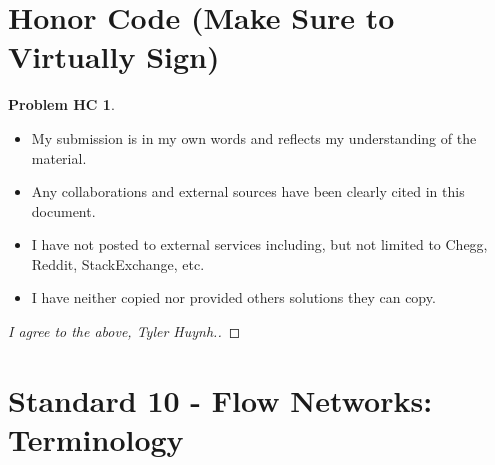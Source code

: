 \documentclass[11pt]{article}
\theoremstyle{definition}
\theoremstyle{definition}
\newtheorem*{requiredHC}{Problem HC}
\theoremstyle{definition}
\begin{document}
\section*{Honor Code (Make Sure to Virtually Sign)} \label{HonorCode}
\hypertarget{HonorCode}{}

\begin{requiredHC}
\begin{itemize}
\item My submission is in my own words and reflects my understanding of the material.
\item Any collaborations and external sources have been clearly cited in this document.
\item I have not posted to external services including, but not limited to Chegg, Reddit, StackExchange, etc.
\item I have neither copied nor provided others solutions they can copy.
\end{itemize}

\end{requiredHC}

\begin{proof}[I agree to the above, Tyler Huynh.]
\end{proof}


\newpage
\setcounter{section}{9}
\section{Standard 10 - Flow Networks: Terminology}
\end{document}
